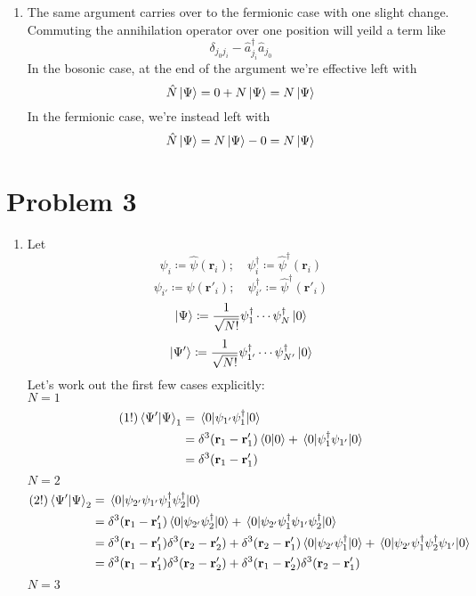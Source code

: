 \documentclass[12pt]{article}
\newcommand{\deltaDif}[2]{\delta^3(\mathbf{r}_{#1} - \mathbf{r}'_{#2})}
\begin{document}
\begin{enumerate}[label=(\alph*)]
    \item The same argument carries over to the fermionic case with one slight change. Commuting the annihilation operator over one position will yeild a term like
    \[ \delta_{j_0j_i} - \hat{a}_{j_i}^\dag\hat{a}_{j_0} \]
    In the bosonic case, at the end of the argument we're effective left with 
    \[ \hat{N}\ket{\Psi} = 0 + N\ket{\Psi} = N\ket{\Psi} \]
    In the fermionic case, we're instead left with
    \[ \hat{N}\ket{\Psi} = N\ket{\Psi} - 0 = N\ket{\Psi} \]

\end{enumerate}


\section*{Problem 3}
\begin{enumerate}[label=(\alph*)]
    \item Let
    \[ \psi_i \coloneqq \hat{\psi}(\mathbf{r}_i); \quad \psi_i^\dag \coloneqq \hat{\psi}^\dag(\mathbf{r}_i) \]
    \[ \psi_{i'} \coloneqq \hat{\psi}(\mathbf{r}'_i); \quad \psi_{i'}^\dag \coloneqq \hat{\psi}^\dag(\mathbf{r}'_i) \]
    \[ \ket{\Psi} \coloneqq \frac{1}{\sqrt{N!}}\psi_1^\dag\cdots\psi_N^\dag\ket{0} \]
    \[ \ket{\Psi'} \coloneqq \frac{1}{\sqrt{N!}}\psi_{1'}^\dag\cdots\psi_{N'}^\dag\ket{0} \]
    Let's work out the first few cases explicitly: \\
    $N=1$
    \begin{align*}
        (1!)\braket{\Psi'}{\Psi}_1 &= \mel{0}{\psi_{1'}\psi_1^\dag}{0} \\
        &= \deltaDif{1}{1}\braket{0}{0} + \mel{0}{\psi_1^\dag\psi_{1'}}{0} \\
        &= \deltaDif{1}{1}
    \end{align*}
    $N=2$
    \begin{align*}
        (2!)\braket{\Psi'}{\Psi}_2 &= \mel{0}{\psi_{2'}\psi_{1'}\psi_1^\dag\psi_2^\dag}{0} \\
        &= \deltaDif{1}{1}\mel{0}{\psi_{2'}\psi_2^\dag}{0}  + \mel{0}{\psi_{2'}\psi_1^\dag\psi_{1'}\psi_2^\dag}{0} \\
        &= \deltaDif{1}{1}\deltaDif{2}{2} +\deltaDif{2}{1}\mel{0}{\psi_{2'}\psi_1^\dag}{0} + \mel{0}{\psi_{2'}\psi_1^\dag\psi_2^\dag\psi_{1'}}{0} \\
        &= \deltaDif{1}{1}\deltaDif{2}{2} + \deltaDif{1}{2}\deltaDif{2}{1}
    \end{align*}
    $N=3$
    \begin{align*}

\end{align*}
\end{enumerate}
\end{document}
